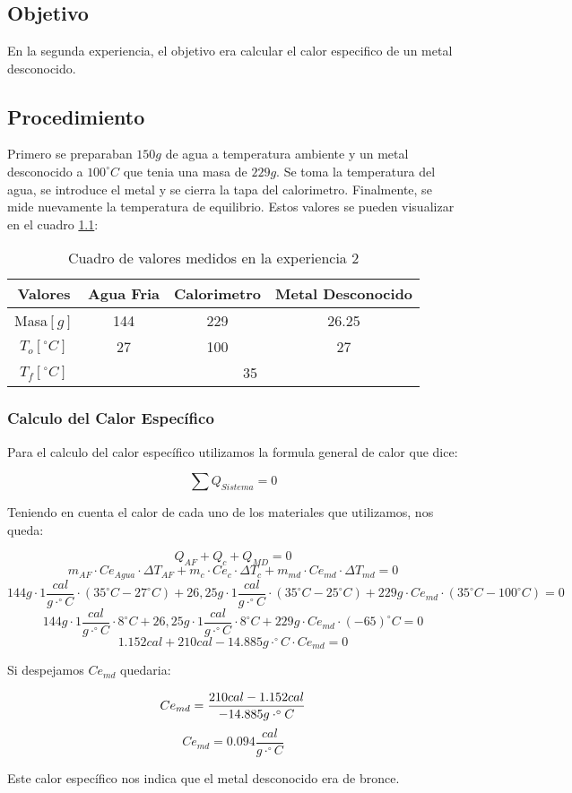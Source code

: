 \documentclass[12pt]{report}
\begin{document}
\chapter{}
\section{Objetivo}
En la segunda experiencia, el objetivo era calcular el calor especifico de un metal desconocido.

\section{Procedimiento}
Primero se preparaban $150 g$ de agua a temperatura ambiente y un metal desconocido a $100^\circ C$ que tenia una masa de $229 g$. Se toma la temperatura del agua, se introduce el metal y se cierra la tapa del calorimetro. Finalmente, se mide nuevamente la temperatura de equilibrio.
Estos valores se pueden visualizar en el cuadro \ref{table:data}:

\begin{table}[h!]
\centering
\begin{tabular}{|c|c|c|c|}
    \hline
    Valores & Agua Fria & Calorimetro & Metal Desconocido \\
    \hline
    Masa$[g]$ & 144 & 229 & 26.25 \\
    \hline
    $T_o [^\circ C]$ & 27 & 100 & 27 \\
    \hline
    $T_f [^\circ C]$ & \multicolumn{3}{|c|}{35}\\
    \hline
\end{tabular}
\caption{Cuadro de valores medidos en la experiencia 2}
\label{table:data}
\end{table}

\subsection{Calculo del Calor Específico}

Para el calculo del calor específico utilizamos la formula general de calor que dice:

$$\sum Q_{Sistema} = 0$$

\noindent
Teniendo en cuenta el calor de cada uno de los materiales que utilizamos, nos queda:

$$Q_{AF} + Q_c + Q_{MD} = 0$$
$$m_{AF} \cdot Ce_{Agua} \cdot {\Delta T}_{AF} + m_c \cdot Ce_c \cdot {\Delta T}_c + m_{md} \cdot Ce_{md} \cdot {\Delta T}_{md} = 0$$
$$144g \cdot 1 \frac{cal}{g\cdot^\circ C} \cdot (35^\circ C - 27^\circ C) + 26,25g \cdot 1 \frac{cal}{g\cdot^\circ C} \cdot (35^\circ C - 25^\circ C) + 229g \cdot  Ce_{md} \cdot (35^\circ C - 100^\circ C) = 0$$
$$144g \cdot 1 \frac{cal}{g\cdot^\circ C} \cdot 8^\circ C + 26,25g \cdot 1 \frac{cal}{g\cdot^\circ C} \cdot 8^\circ C + 229g \cdot Ce_{md}  \cdot (-65)^\circ C = 0$$
$$1.152 cal + 210 cal - 14.885 g\cdot^\circ C \cdot Ce_{md}  = 0$$

\noindent
Si despejamos $Ce_{md}$ quedaria:

$$Ce_{md}  = \frac{210 cal - 1.152 cal}{-14.885 g\cdot^\circ C}\\$$
$$Ce_{md}  = 0.094 \frac{cal}{g\cdot^\circ C}$$

\noindent
Este calor específico nos indica que el metal desconocido era de bronce.
\end{document}
